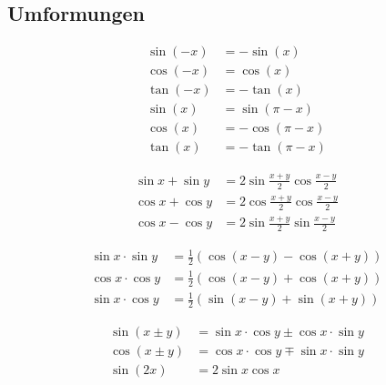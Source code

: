 \begin{multicols}{2}
	\subsection{Umformungen}
		\begin{proofhelp}[Symmetrien]
			\begin{align*}
				\sin \left( -x \right) &= -\sin \left( x \right) \\
				\cos \left( -x \right) &= \cos \left( x \right) \\
				\tan \left( -x \right) &= -\tan \left( x \right) \\[1em]
				\sin \left( x \right) &= \sin \left( \pi - x \right) \\
				\cos \left( x \right) &= -\cos \left( \pi - x \right) \\
				\tan \left( x \right) &= -\tan \left( \pi - x \right)
			\end{align*}
		\end{proofhelp}
		\begin{proofhelp}[Summen]
			\begin{align*}
				\sin x + \sin y &= 2 \sin \frac{x + y}{2} \cos \frac{x - y}{2} \\
				\cos x + \cos y &= 2 \cos \frac{x + y}{2} \cos \frac{x - y}{2} \\
				\cos x - \cos y &= 2 \sin \frac{x + y}{2} \sin \frac{x - y}{2} 
			\end{align*}
		\end{proofhelp}
		\begin{proofhelp}[Produkte]
			\begin{align*}
				\sin x \cdot \sin y &= \frac{1}{2}\left( \cos \left( x - y \right) - \cos \left( x + y \right) \right) \\
				\cos x \cdot \cos y &= \frac{1}{2}\left( \cos \left( x - y \right) + \cos \left( x + y \right) \right) \\
				\sin x \cdot \cos y &= \frac{1}{2}\left( \sin \left( x - y \right) + \sin \left( x + y \right) \right) 
			\end{align*}
		\end{proofhelp}
		\begin{proofhelp}[Additionstheoreme]
			\begin{align*}
				\sin \left( x \pm y \right) &= \sin x \cdot \cos y \pm \cos x \cdot \sin y \\
				\cos \left( x \pm y \right) &= \cos x \cdot \cos y \mp \sin x \cdot \sin y \\
				\sin \left( 2x \right) &= 2 \sin x \cos x \\

\end{align*}
\end{proofhelp}
\end{multicols}
